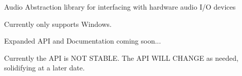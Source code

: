 Audio Abstraction library for interfacing with hardware audio I/\-O devices

Currently only supports Windows.

Expanded A\-P\-I and Documentation coming soon...

Currently the A\-P\-I is N\-O\-T S\-T\-A\-B\-L\-E. The A\-P\-I W\-I\-L\-L C\-H\-A\-N\-G\-E as needed, solidifying at a later date. 